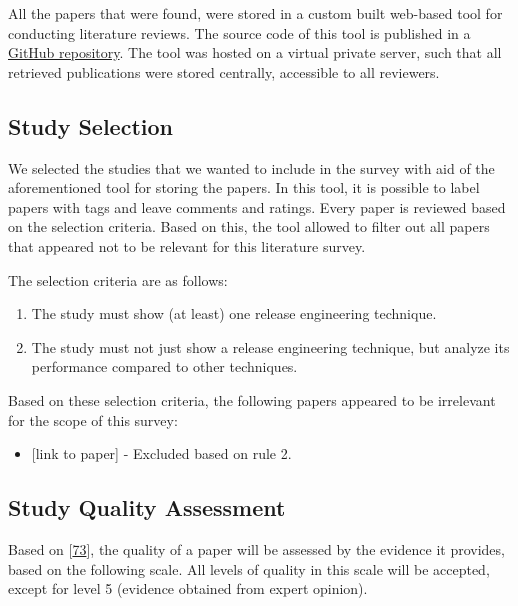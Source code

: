 \documentclass[]{book}
\providecommand{\tightlist}{%
  \setlength{\itemsep}{0pt}\setlength{\parskip}{0pt}}
\begin{document}
All the papers that were found, were stored in a custom built web-based
tool for conducting literature reviews. The source code of this tool is
published in a \href{https://github.com/jessetilro/research}{GitHub
repository}. The tool was hosted on a virtual private server, such that
all retrieved publications were stored centrally, accessible to all
reviewers.

\subsection{Study Selection}\label{study-selection}

We selected the studies that we wanted to include in the survey with aid
of the aforementioned tool for storing the papers. In this tool, it is
possible to label papers with tags and leave comments and ratings. Every
paper is reviewed based on the selection criteria. Based on this, the
tool allowed to filter out all papers that appeared not to be relevant
for this literature survey.

The selection criteria are as follows:

\begin{enumerate}
\def\labelenumi{\arabic{enumi}.}
\tightlist
\item
  The study must show (at least) one release engineering technique.
\item
  The study must not just show a release engineering technique, but
  analyze its performance compared to other techniques.
\end{enumerate}

Based on these selection criteria, the following papers appeared to be
irrelevant for the scope of this survey:

\begin{itemize}
\tightlist
\item
  {[}link to paper{]} - Excluded based on rule 2.
\end{itemize}

\subsection{Study Quality Assessment}\label{study-quality-assessment}

Based on {[}\protect\hyperlink{ref-kitchenham2004procedures}{73}{]}, the
quality of a paper will be assessed by the evidence it provides, based
on the following scale. All levels of quality in this scale will be
accepted, except for level 5 (evidence obtained from expert opinion).
\end{document}
